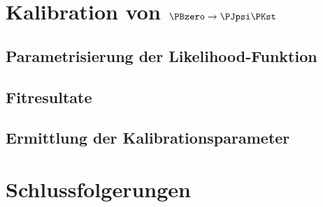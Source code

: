 \section{\texorpdfstring{Kalibration von $\PBzero \to \PJpsi \PKst$}{Kalibration von B0 -> JpsiKst}}


\subsection{Parametrisierung der Likelihood-Funktion}



\subsection{Fitresultate}


\subsection{Ermittlung der Kalibrationsparameter}


\section{Schlussfolgerungen}


